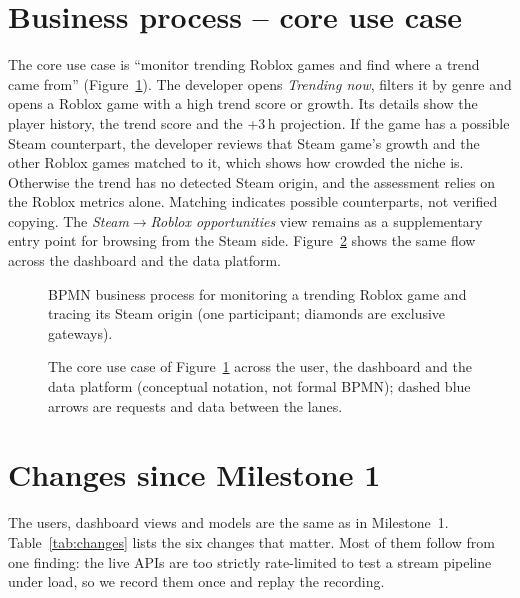 \documentclass[10pt,a4paper]{article}
\begin{document}
\section{Business process -- core use case}\label{sec:process}
The core use case is ``monitor trending Roblox games and find where a trend came from'' (Figure~\ref{fig:bpmn}). The developer opens \emph{Trending now}, filters it by genre and opens a Roblox game with a high trend score or growth. Its details show the player history, the trend score and the +3\,h projection. If the game has a possible Steam counterpart, the developer reviews that Steam game's growth and the other Roblox games matched to it, which shows how crowded the niche is. Otherwise the trend has no detected Steam origin, and the assessment relies on the Roblox metrics alone. Matching indicates possible counterparts, not verified copying. The \emph{Steam$\rightarrow$Roblox opportunities} view remains as a supplementary entry point for browsing from the Steam side. Figure~\ref{fig:interaction-overview} shows the same flow across the dashboard and the data platform.

\begin{landscape}
\begin{figure}[p]
\centering
\resizebox{\linewidth}{!}{}
\caption{BPMN business process for monitoring a trending Roblox game and tracing its Steam origin (one participant; diamonds are exclusive gateways).}
\label{fig:bpmn}
\end{figure}
\end{landscape}

\begin{landscape}
\begin{figure}[p]
\centering
\resizebox{\linewidth}{!}{}
\caption{The core use case of Figure~\ref{fig:bpmn} across the user, the dashboard and the data platform (conceptual notation, not formal BPMN); dashed blue arrows are requests and data between the lanes.}
\label{fig:interaction-overview}
\end{figure}
\end{landscape}

\section{Changes since Milestone 1}\label{sec:changes}
The users, dashboard views and models are the same as in Milestone~1. Table~\ref{tab:changes} lists the six changes that matter. Most of them follow from one finding: the live APIs are too strictly rate-limited to test a stream pipeline under load, so we record them once and replay the recording.
\end{document}
